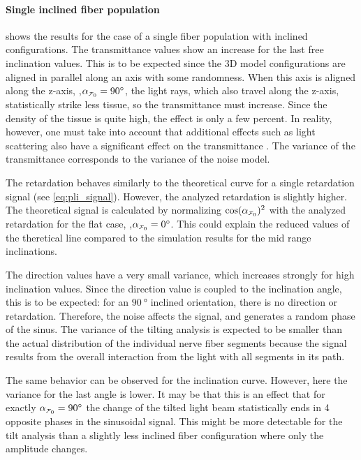 \paragraph{Single inclined fiber population}
 shows the results for the case of a single fiber population with inclined configurations.
The transmittance values show an increase for the last free inclination values.
This is to be expected since the 3D model configurations are aligned in parallel along an axis with some randomness.
When this axis is aligned along the z-axis, \ie{},$\modelInc=\SI{90}{\degree}$, the light rays, which also travel along the z-axis, statistically strike less tissue, so the transmittance must increase.
Since the density of the tissue is quite high, the effect is only a few percent.
In reality, however, one must take into account that additional effects such as light scattering also have a significant effect on the transmittance \cite{Menzel2021}.
The variance of the transmittance corresponds to the variance of the noise model.
\par
%
The retardation behaves similarly to the theoretical curve for a single retardation signal (see \cref{eq:pli_signal}).
However, the analyzed retardation is slightly higher.
The theoretical signal is calculated by normalizing $\cos(\modelInc)^2$ with the analyzed retardation for the flat case, \ie{},$\modelInc = \SI{0}{\degree}$.
This could explain the reduced values of the theretical line compared to the simulation results for the mid range inclinations.
\par
%
The direction values have a very small variance, which increases strongly for high inclination values.
Since the direction value is coupled to the inclination angle, this is to be expected: for an $\SI{90}{\degree}$ inclined orientation, there is no direction or retardation.
Therefore, the noise affects the signal, and generates a random phase of the sinus.
The variance of the tilting analysis is expected to be smaller than the actual distribution of the individual nerve fiber segments because the signal results from the overall interaction from the light with all segments in its path.
\par
%
The same behavior can be observed for the inclination curve.
However, here the variance for the last angle is lower.
It may be that this is an effect that for exactly $\modelInc=\SI{90}{\degree}$ the change of the tilted light beam statistically ends in 4 opposite phases in the sinusoidal signal.
This might be more detectable for the tilt analysis than a slightly less inclined fiber configuration where only the amplitude changes.
